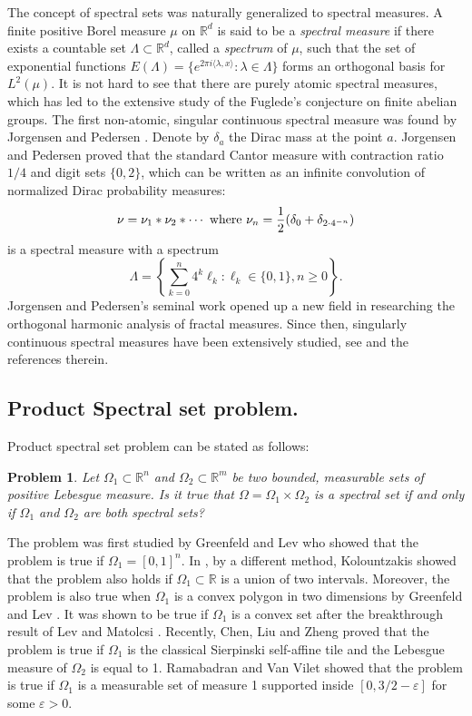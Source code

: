 \documentclass[reqno,a4paper,12pt]{amsart}
\numberwithin{equation}{section}
\newcounter{rem}
\newtheorem{problem}[theorem]{Problem}
\theoremstyle{remark}
\numberwithin{equation}{section}
\begin{document}
The concept of spectral sets was naturally generalized to spectral measures. {A finite positive Borel measure $\mu$ on $\mathbb{R}^{d}$ is said to be a \textit{spectral measure} if there exists a countable set $\Lambda\subset\mathbb{R}^{d}$, called a \textit{spectrum} of $\mu$, such that the set of exponential functions
$E(\Lambda)=\{e^{2\pi i\langle\lambda, x\rangle}:\lambda\in \Lambda\}$
forms an orthogonal basis for $\textit{L}^{2}(\mu)$.} It is not hard to see that there are purely atomic spectral measures, which has led to the extensive study of the Fuglede's conjecture on finite abelian groups.  The first non-atomic, singular continuous spectral measure was found by Jorgensen and Pedersen \cite{dense}. Denote by $\delta_a$ the Dirac mass at the point $a$.  Jorgensen and Pedersen \cite{dense} proved that {the standard Cantor measure with contraction ratio $1/4$ and digit sets $\{0,2\}$, which can be written as an infinite convolution of normalized Dirac probability measures:
\begin{equation}\label{jdcd}
\nu= \nu_1\ast\nu_2\ast\cdots  \ \textup{where}  \ \nu_n = \frac12(\delta_0+ \delta_{2\cdot4^{-n}})
\end{equation}
is a spectral measure}  with a spectrum
\[
\Lambda=\displaystyle\left\{\sum_{k=0}^{n}4^{k}\ell_{k}:\ell_{k}\in\{0,1\},n\geq0\right\}.
\]
Jorgensen and Pedersen's seminal work opened up a new field in researching the orthogonal harmonic
analysis of fractal measures. Since then, singularly continuous spectral measures have been extensively studied, see \cite{DHL} and the references therein.




\subsection{Product Spectral set problem.} Product spectral set problem can be stated as follows:

\begin{problem}\label{conjecture}
Let $\Omega_1\subset\mathbb{R}^{n}$ and $\Omega_2\subset\mathbb{R}^{m}$ be two bounded, measurable sets of positive Lebesgue measure. Is it true that  $\Omega=\Omega_1\times \Omega_2$ is a spectral set if and only if $\Omega_1$ and $\Omega_2$ are both spectral sets? 
\end{problem}

The problem was first studied by Greenfeld and Lev \cite{GL-JFA} who showed that the problem is true if $\Omega_1 = [0,1]^n$. In \cite{KMN-BHM}, by a different method, Kolountzakis showed that the problem also holds if $\Omega_1\subset\mathbb{R}$ is a union of two intervals. Moreover,  the problem is also true when $\Omega_1$ is a convex polygon in two dimensions by Greenfeld and Lev \cite{GL-JAM}. It was shown to be true if $\Omega_1$ is a convex set \cite{KLM-Signal} after the breakthrough result of Lev and Matolcsi \cite{LM-AM}.  Recently, Chen, Liu and Zheng \cite{CLZ-JGA} proved that the problem is true if
$\Omega_1$ is the classical Sierpinski self-affine tile and the Lebesgue measure of $\Omega_2$ is equal to 1. Ramabadran and Van Vilet \cite{RV-ARX} showed that the problem is true if $\Omega_1$ is a measurable set of measure 1 supported inside $[0,3/2-\varepsilon]$ for some $\varepsilon>0$. 
\end{document}

